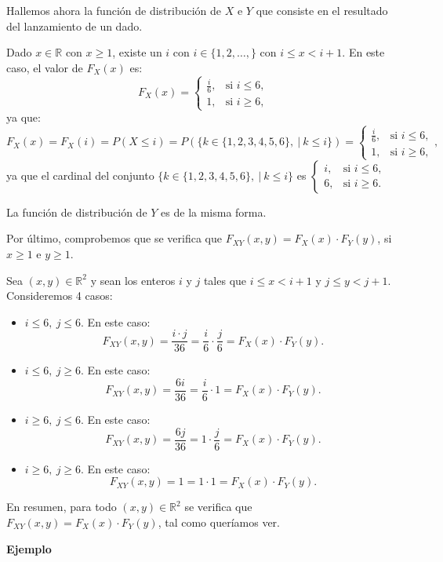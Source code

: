 \documentclass[]{book}
\begin{document}
Hallemos ahora la función de distribución de \(X\) e \(Y\) que consiste en el resultado del lanzamiento de un dado.

Dado \(x\in\mathbb{R}\) con \(x\geq 1\), existe un \(i\) con \(i\in\{1,2,\ldots,\}\) con \(i\leq x <i+1\). En este caso, el valor de \(F_X(x)\) es:
\[
F_X(x)=\begin{cases}
\frac{i}{6}, &\mbox{si }i\leq 6,\\
1, & \mbox{si }i\geq 6,
\end{cases}
\]
ya que:
\[
F_X(x)=F_X(i)=P(X\leq i)=P(\{k\in\{1,2,3,4,5,6\},\ |\ k\leq i\})=\begin{cases}
\frac{i}{6}, &\mbox{si }i\leq 6,\\
1, & \mbox{si }i\geq 6,
\end{cases},
\]
ya que el cardinal del conjunto \(\{k\in\{1,2,3,4,5,6\},\ |\ k\leq i\}\) es \(\begin{cases} i, &\mbox{si }i\leq 6,\\ 6, & \mbox{si }i\geq 6. \end{cases}\)

La función de distribución de \(Y\) es de la misma forma.

Por último, comprobemos que se verifica que \(F_{XY}(x,y)=F_X(x)\cdot F_Y(y)\), si \(x\geq 1\) e \(y\geq 1\).

Sea \((x,y)\in\mathbb{R}^2\) y sean los enteros \(i\) y \(j\) tales que \(i\leq x<i+1\) y \(j\leq y<j+1\). Consideremos 4 casos:

\begin{itemize}
\item
  \(i\leq 6, \ j\leq 6\). En este caso:
  \[
  F_{XY}(x,y)=\frac{i\cdot j}{36}=\frac{i}{6}\cdot \frac{j}{6}=F_X(x)\cdot F_Y(y).
  \]
\item
  \(i\leq 6,\ j\geq 6\). En este caso:
  \[
  F_{XY}(x,y)=\frac{6i}{36}=\frac{i}{6}\cdot 1=F_X(x)\cdot F_Y(y).
  \]
\item
  \(i\geq 6,\ j\leq 6\). En este caso:
  \[
  F_{XY}(x,y)=\frac{6j}{36}=1\cdot \frac{j}{6}=F_X(x)\cdot F_Y(y).
  \]
\item
  \(i\geq 6,\ j\geq 6\). En este caso:
  \[
  F_{XY}(x,y)=1=1\cdot 1=F_X(x)\cdot F_Y(y).
  \]
\end{itemize}

En resumen, para todo \((x,y)\in \mathbb{R}^2\) se verifica que \(F_{XY}(x,y)=F_X(x)\cdot F_Y(y)\), tal como queríamos ver.

\textbf{Ejemplo}
\end{document}
